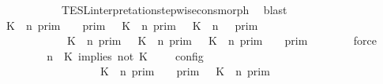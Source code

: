 \begin{isabellebody}
\ \ \ \ \ \ \ \ \ \ \ \ TESL{\isacharunderscore}interpretation{\isacharunderscore}stepwise{\isacharunderscore}cons{\isacharunderscore}morph\ \isamarkupfalse%
\ blast\isanewline
\ \ \ \ \isamarkupfalse%
\ {\isacartoucheopen}{\isasymlbrakk}\ K\ {\isasymnot}{\isasymUp}\ n\ {\isasymrbrakk}\isactrlsub p\isactrlsub r\isactrlsub i\isactrlsub m\ {\isasyminter}\ {\isasymlbrakk}{\isasymlbrakk}\ {\isasymGamma}\ {\isasymrbrakk}{\isasymrbrakk}\isactrlsub p\isactrlsub r\isactrlsub i\isactrlsub m\ {\isasymunion}\ {\isasymlbrakk}\ K\ {\isasymUp}\ n\ {\isasymrbrakk}\isactrlsub p\isactrlsub r\isactrlsub i\isactrlsub m\ {\isasyminter}\ {\isasymlbrakk}{\isasymlbrakk}\ {\isacharparenleft}K\ {\isasymnot}{\isasymUp}\ n{\isacharparenright}\ {\isacharhash}\ {\isasymGamma}\ {\isasymrbrakk}{\isasymrbrakk}\isactrlsub p\isactrlsub r\isactrlsub i\isactrlsub m\isanewline
\ \ \ \ \ \ \ \ \ \ \ {\isacharequal}\ {\isacharparenleft}{\isasymlbrakk}\ K\ {\isasymnot}{\isasymUp}\ n\ {\isasymrbrakk}\isactrlsub p\isactrlsub r\isactrlsub i\isactrlsub m\ {\isasymunion}\ {\isasymlbrakk}\ K\ {\isasymUp}\ n\ {\isasymrbrakk}\isactrlsub p\isactrlsub r\isactrlsub i\isactrlsub m\ {\isasyminter}\ {\isasymlbrakk}\ K\ {\isasymnot}{\isasymUp}\ n\ {\isasymrbrakk}\isactrlsub p\isactrlsub r\isactrlsub i\isactrlsub m{\isacharparenright}\ {\isasyminter}\ {\isasymlbrakk}{\isasymlbrakk}\ {\isasymGamma}\ {\isasymrbrakk}{\isasymrbrakk}\isactrlsub p\isactrlsub r\isactrlsub i\isactrlsub m{\isacartoucheclose}\isanewline
\ \ \ \ \ \ \isamarkupfalse%
\ force\isanewline
\ \ \ \ \isamarkupfalse%
\ \isamarkupfalse%
\ {\isacartoucheopen}{\isasymlbrakk}\ {\isasymGamma}{\isacharcomma}\ n\ {\isasymturnstile}\ {\isacharparenleft}{\isacharparenleft}K\ implies\ not\ K\ {\isacharhash}\ {\isasymPsi}{\isacharparenright}\ {\isasymtriangleright}\ {\isasymPhi}\ {\isasymrbrakk}\isactrlsub c\isactrlsub o\isactrlsub n\isactrlsub f\isactrlsub i\isactrlsub g\isanewline
\ \ \ \ \ \ \ \ \ \ \ \ \ \ \ \ \ {\isacharequal}\ {\isacharparenleft}{\isasymlbrakk}\ K\ {\isasymnot}{\isasymUp}\ n\ {\isasymrbrakk}\isactrlsub p\isactrlsub r\isactrlsub i\isactrlsub m\ {\isasyminter}\ {\isasymlbrakk}{\isasymlbrakk}\ {\isasymGamma}\ {\isasymrbrakk}{\isasymrbrakk}\isactrlsub p\isactrlsub r\isactrlsub i\isactrlsub m\ {\isasymunion}\ {\isasymlbrakk}\ K\ {\isasymUp}\ n\ {\isasymrbrakk}\isactrlsub p\isactrlsub r\isactrlsub i\isactrlsub m\isanewline

\end{isabellebody}
